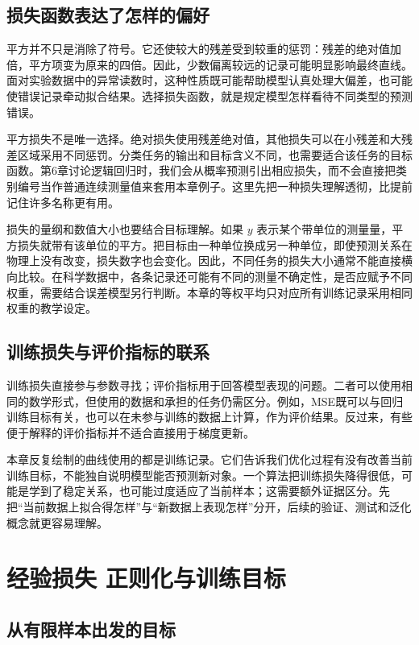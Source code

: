 \subsection{损失函数表达了怎样的偏好}

平方并不只是消除了符号。它还使较大的残差受到较重的惩罚：残差的绝对值加倍，平方项变为原来的四倍。因此，少数偏离较远的记录可能明显影响最终直线。面对实验数据中的异常读数时，这种性质既可能帮助模型认真处理大偏差，也可能使错误记录牵动拟合结果。选择损失函数，就是规定模型怎样看待不同类型的预测错误。

平方损失不是唯一选择。绝对损失使用残差绝对值，其他损失可以在小残差和大残差区域采用不同惩罚。分类任务的输出和目标含义不同，也需要适合该任务的目标函数。第6章讨论逻辑回归时，我们会从概率预测引出相应损失，而不会直接把类别编号当作普通连续测量值来套用本章例子。这里先把一种损失理解透彻，比提前记住许多名称更有用。

损失的量纲和数值大小也要结合目标理解。如果 \(y\) 表示某个带单位的测量量，平方损失就带有该单位的平方。把目标由一种单位换成另一种单位，即使预测关系在物理上没有改变，损失数字也会变化。因此，不同任务的损失大小通常不能直接横向比较。在科学数据中，各条记录还可能有不同的测量不确定性，是否应赋予不同权重，需要结合误差模型另行判断。本章的等权平均只对应所有训练记录采用相同权重的教学设定。

\subsection{训练损失与评价指标的联系}

训练损失直接参与参数寻找；评价指标用于回答模型表现的问题。二者可以使用相同的数学形式，但使用的数据和承担的任务仍需区分。例如，MSE既可以与回归训练目标有关，也可以在未参与训练的数据上计算，作为评价结果。反过来，有些便于解释的评价指标并不适合直接用于梯度更新。

本章反复绘制的曲线使用的都是训练记录。它们告诉我们优化过程有没有改善当前训练目标，不能独自说明模型能否预测新对象。一个算法把训练损失降得很低，可能是学到了稳定关系，也可能过度适应了当前样本；这需要额外证据区分。先把``当前数据上拟合得怎样''与``新数据上表现怎样''分开，后续的验证、测试和泛化概念就更容易理解。

\section{经验损失 正则化与训练目标}

\subsection{从有限样本出发的目标}


